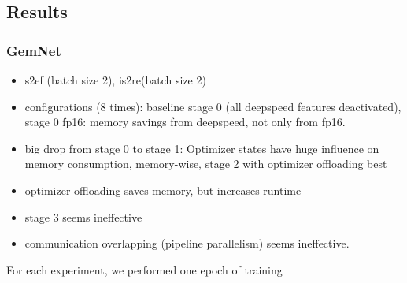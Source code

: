 \subsection{Results}

\subsubsection{GemNet}

\begin{itemize}
    \item s2ef (batch size 2), is2re(batch size 2)
    \item configurations (8 times): baseline stage 0 (all deepspeed features deactivated), 
    stage 0 fp16: memory savings from deepspeed, not only from fp16. 
    \item big drop from stage 0 to stage 1: Optimizer states have huge influence on
    memory consumption, memory-wise, stage 2 with optimizer offloading best
    \item optimizer offloading saves memory, but increases runtime
    \item stage 3 seems ineffective
    \item communication overlapping (pipeline parallelism) seems ineffective.
\end{itemize}

For each experiment, we performed one epoch of training

